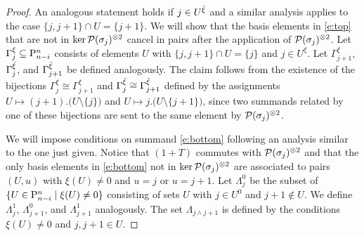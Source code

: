 \begin{proof}
	An analogous statement holds if $j \in U^\barxi$ and a similar analysis applies to the case $\{j, j+1\} \cap U = \{j+1\}$.
	We will show that the basis elements in \eqref{e:top} that are not in $\ker \cP(\sigma_j)^{\ot 2}$ cancel in pairs after the application of $\cP(\sigma_j)^{\ot 2}$.
	Let $\Gamma_j^\xi \subseteq \P_{n-i}^n$ consists of elements $U$ with $\{j, j+1\} \cap U = \{j\}$ and $j \in U^\xi$.
	Let $\Gamma_{j+1}^\xi$, $\Gamma_j^\barxi$, and $\Gamma_{j+1}^\barxi$ be defined analogously.
	The claim follows from the existence of the bijections $\Gamma_{j}^\xi \cong \Gamma_{j+1}^\xi$ and $\Gamma_{j}^\barxi \cong \Gamma_{j+1}^\barxi$ defined by the assignments $U \mapsto (j+1).\big( U \setminus \{j\} \big)$ and $U \mapsto j.\big( U \setminus \{j+1\} \big)$, since two summands related by one of these bijections are sent to the same element by $\cP(\sigma_j)^{\ot 2}$.

	We will impose conditions on summand \eqref{e:bottom} following an analysis similar to the one just given.
	Notice that $(1+T)$ commutes with $\cP(\sigma_j)^{\ot 2}$ and that the only basis elements in \eqref{e:bottom} not in $\ker \cP(\sigma_j)^{\ot 2}$ are associated to pairs $(U, u)$ with $\xi(U) \neq 0$ and $u = j$ or $ u = j+1$.
	Let $\Lambda_{j}^0$ be the subset of $\{U \in \P_{n-i}^n \mid \xi(U) \neq 0\}$ consisting of sets $U$ with $j \in U^0$ and $j+1 \notin U$.
	We define $\Lambda_{j}^1$, $\Lambda_{j+1}^0$, and $\Lambda_{j+1}^1$ analogously.
	The set $\Lambda_{j \wedge j+1}$ is defined by the conditions $\xi(U) \neq 0$ and $j,j+1 \in U$.


\end{proof}
